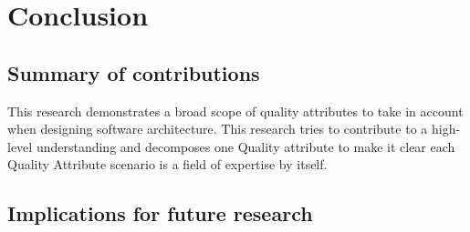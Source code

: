 \chapter{Conclusion}\label{s:conclusion}
\section{Summary of contributions}
This research demonstrates a broad scope of quality attributes to take in account when designing software architecture. This research tries to contribute to a high-level understanding and decomposes one Quality attribute to make it clear each Quality Attribute scenario is a field of expertise by itself.  

\section{Implications for future research}

